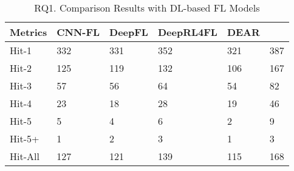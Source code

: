 \begin{table}[t]
{\begin{center}
			\label{fig:rq1-details}
		\end{center}
	}
\end{table}

\begin{table}[t]
	\caption{RQ1. Comparison Results with DL-based FL Models}
	\vspace{-10pt}
	{\small
		\begin{center}
			\renewcommand{\arraystretch}{1}
			\begin{tabular}{p{1.2cm}<{\centering}|p{1cm}<{\centering}|p{0.8cm}<{\centering}|p{1.2cm}<{\centering}|p{1cm}<{\centering}|p{1.2cm}<{\centering}}
				\hline
				Metrics & CNN-FL & DeepFL & DeepRL4FL & DEAR & \tool \\			
				\hline
				Hit-1   & 332 & 331 & 352 & 321 & 387 \\
				Hit-2	& 125 & 119 & 132 & 106 & 167 \\
				Hit-3	& 57 & 56 & 64 & 54 & 82 \\
				Hit-4	& 23 & 18 & 28 & 19 & 46 \\
				Hit-5	& 5 & 4 & 6 & 2 & 9 \\
				Hit-5+	& 1 & 2 & 3 & 1 & 3 \\
                                Hit-All & 127  & 121  & 139  & 115 & 168\\
				\hline
			\end{tabular}
			
			\label{fig:rq1-overview}
		\end{center}
	}
\end{table}

